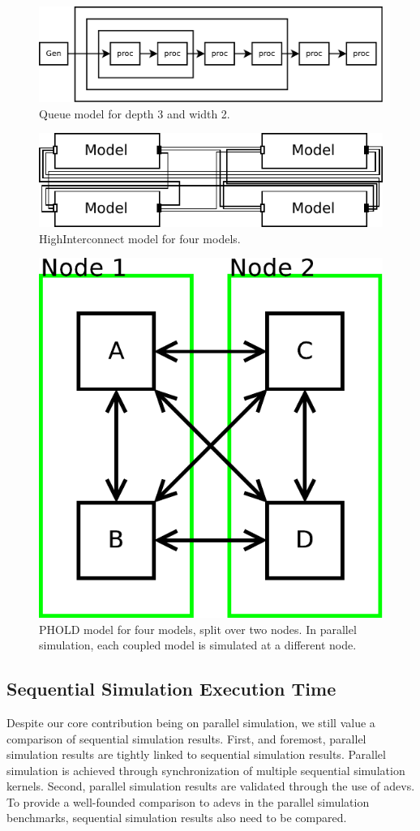 \begin{figure}
    \center
    \includegraphics[width=\columnwidth]{fig/queue_model.pdf}
    \caption{Queue model for depth 3 and width 2.}
    \label{fig:queue_model}
\end{figure}

\begin{figure}
    \center
    \includegraphics[width=\columnwidth]{fig/interconnect_model.pdf}
    \caption{HighInterconnect model for four models.}
    \label{fig:interconnect_model}
\end{figure}

\begin{figure}
    \center
    \includegraphics[width=0.5\columnwidth]{fig/phold_model.pdf}
    \caption{PHOLD model for four models, split over two nodes. In parallel simulation, each coupled model is simulated at a different node.}
    \label{fig:PHOLD_model}
\end{figure}

\subsection{Sequential Simulation Execution Time}
Despite our core contribution being on parallel simulation, we still value a comparison of sequential simulation results.
First, and foremost, parallel simulation results are tightly linked to sequential simulation results.
Parallel simulation is achieved through synchronization of multiple sequential simulation kernels.
Second, parallel simulation results are validated through the use of adevs.
To provide a well-founded comparison to adevs in the parallel simulation benchmarks, sequential simulation results also need to be compared.

